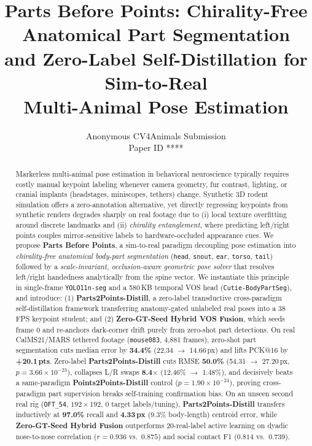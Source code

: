 \documentclass[10pt,twocolumn,letterpaper]{article}
\title{\vspace{-2.2em}\Large\textbf{Parts Before Points: Chirality-Free Anatomical Part Segmentation\\and Zero-Label Self-Distillation for Sim-to-Real\\Multi-Animal Pose Estimation}\vspace{-0.6em}}
\author{
  Anonymous CV4Animals Submission\\
  \small Paper ID ****
}
\date{\vspace{-1.6em}}
\begin{document}
\linenumbers
\raggedbottom
\maketitle
\thispagestyle{plain}

\setlength{\abovedisplayskip}{4pt}
\setlength{\belowdisplayskip}{4pt}

\begin{abstract}
\vspace{-0.45em}
Markerless multi-animal pose estimation in behavioral neuroscience typically requires costly manual keypoint labeling whenever camera geometry, fur contrast, lighting, or cranial implants (headstages, miniscopes, tethers) change. Synthetic 3D rodent simulation offers a zero-annotation alternative, yet directly regressing keypoints from synthetic renders degrades sharply on real footage due to (i) local texture overfitting around discrete landmarks and (ii) \emph{chirality entanglement}, where predicting left/right points couples mirror-sensitive labels to hardware-occluded appearance cues. We propose \textbf{Parts Before Points}, a sim-to-real paradigm decoupling pose estimation into \emph{chirality-free anatomical body-part segmentation} (\texttt{head}, \texttt{snout}, \texttt{ear}, \texttt{torso}, \texttt{tail}) followed by a \emph{scale-invariant, occlusion-aware geometric pose solver} that resolves left/right handedness analytically from the spine vector. We instantiate this principle in single-frame \texttt{YOLO11n-seg} and a 580\,KB temporal VOS head (\texttt{Cutie-BodyPartSeg}), and introduce: (1) \textbf{Parts2Points-Distill}, a zero-label transductive cross-paradigm self-distillation framework transferring anatomy-gated unlabeled real poses into a 38\,FPS keypoint student; and (2) \textbf{Zero-GT-Seed Hybrid VOS Fusion}, which seeds frame 0 and re-anchors dark-corner drift purely from zero-shot part detections. On real CalMS21/MARS tethered footage (\texttt{mouse083}, 4,881 frames), zero-shot part segmentation cuts median error by \textbf{34.4\%} (22.34 $\to$ 14.66\,px) and lifts PCK@16 by \textbf{+20.1\,pts}. Zero-label \textbf{Parts2Points-Distill} cuts RMSE \textbf{50.0\%} (54.31 $\to$ 27.20\,px, $p=3.66\times 10^{-23}$), collapses L/R swaps \textbf{8.4$\times$} (12.46\% $\to$ 1.48\%), and decisively beats a same-paradigm \textbf{Points2Points-Distill} control ($p=1.90\times 10^{-24}$), proving cross-paradigm part supervision breaks self-training confirmation bias. On an unseen second real rig (\texttt{OFT\_54}, $192\times 192$, 0 target labels/tuning), \textbf{Parts2Points-Distill} transfers inductively at \textbf{97.0\%} recall and \textbf{4.33\,px} (9.3\% body-length) centroid error, while \textbf{Zero-GT-Seed Hybrid Fusion} outperforms 20-real-label active learning on dyadic nose-to-nose correlation ($r=0.936$ vs.\ $0.875$) and social contact F1 ($0.814$ vs.\ $0.739$).
\end{abstract}
\end{document}
